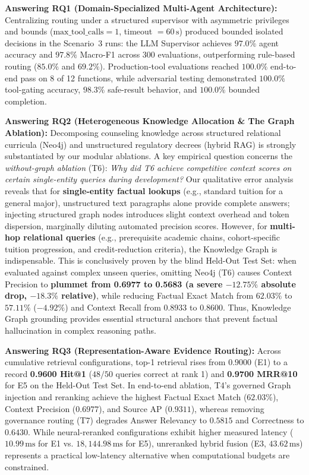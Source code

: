 \textbf{Answering RQ1 (Domain-Specialized Multi-Agent Architecture):} Centralizing routing under a structured supervisor with asymmetric privileges and bounds ($\text{max\_tool\_calls}=1$, timeout $=60\,\text{s}$) produced bounded isolated decisions in the Scenario~3 runs: the LLM Supervisor achieves $97.0\%$ agent accuracy and $97.8\%$ Macro-F1 across 300 evaluations, outperforming rule-based routing ($85.0\%$ and $69.2\%$). Production-tool evaluations reached $100.0\%$ end-to-end pass on 8 of 12 functions, while adversarial testing demonstrated $100.0\%$ tool-gating accuracy, $98.3\%$ safe-result behavior, and $100.0\%$ bounded completion.

\textbf{Answering RQ2 (Heterogeneous Knowledge Allocation \& The Graph Ablation):} Decomposing counseling knowledge across structured relational curricula (Neo4j) and unstructured regulatory decrees (hybrid RAG) is strongly substantiated by our modular ablations. 
A key empirical question concerns the \textit{without-graph ablation} (T6): \textit{Why did T6 achieve competitive context scores on certain single-entity queries during development?}
Our qualitative error analysis reveals that for \textbf{single-entity factual lookups} (e.g., standard tuition for a general major), unstructured text paragraphs alone provide complete answers; injecting structured graph nodes introduces slight context overhead and token dispersion, marginally diluting automated precision scores. 
However, for \textbf{multi-hop relational queries} (e.g., prerequisite academic chains, cohort-specific tuition progression, and credit-reduction criteria), the Knowledge Graph is indispensable. 
This is conclusively proven by the blind Held-Out Test Set: when evaluated against complex unseen queries, omitting Neo4j (T6) causes Context Precision to \textbf{plummet from 0.6977 to 0.5683 (a severe $-12.75\%$ absolute drop, $-18.3\%$ relative)}, while reducing Factual Exact Match from $62.03\%$ to $57.11\%$ ($-4.92\%$) and Context Recall from $0.8933$ to $0.8600$. Thus, Knowledge Graph grounding provides essential structural anchors that prevent factual hallucination in complex reasoning paths.

\textbf{Answering RQ3 (Representation-Aware Evidence Routing):} Across cumulative retrieval configurations, top-1 retrieval rises from $0.9000$ (E1) to a record \textbf{0.9600 Hit@1} ($48/50$ queries correct at rank 1) and \textbf{0.9700 MRR@10} for E5 on the Held-Out Test Set. In end-to-end ablation, T4's governed Graph injection and reranking achieve the highest Factual Exact Match ($62.03\%$), Context Precision ($0.6977$), and Source AP ($0.9311$), whereas removing governance routing (T7) degrades Answer Relevancy to $0.5815$ and Correctness to $0.6430$. While neural-reranked configurations exhibit higher measured latency ($10.99\,\text{ms}$ for E1 vs. $18{,}144.98\,\text{ms}$ for E5), unreranked hybrid fusion (E3, $43.62\,\text{ms}$) represents a practical low-latency alternative when computational budgets are constrained.

